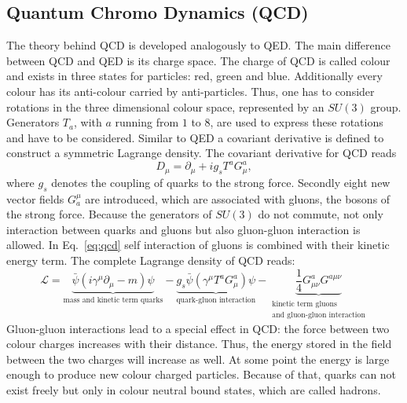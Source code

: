 	\subsection{Quantum Chromo Dynamics (QCD)}
	The theory behind QCD is developed analogously to QED. The main difference between QCD and QED is its charge space. The charge of QCD is called colour and exists in three states for particles: red, green and blue. Additionally every colour has its anti-colour carried by anti-particles. Thus, one has to consider rotations in the three dimensional colour space, represented by an $SU(3)$ group. Generators $T_a$, with $a$ running from $1$ to $8$, are used to express these rotations and have to be considered. Similar to QED a covariant derivative is defined to construct a symmetric Lagrange density. The covariant derivative for QCD reads
	\begin{equation}
	D_\mu = \partial_\mu + i g_s T^a G^a_{\mu},
	\end{equation}
	where $g_s$ denotes the coupling of quarks to the strong force. Secondly eight new vector fields $G_a^\mu$ are introduced, which are associated with gluons, the bosons of the strong force. Because the generators of $SU(3)$ do not commute, not only interaction between quarks and gluons but also gluon-gluon interaction is allowed. In Eq.~\ref{eq:qcd} self interaction of gluons is combined with their kinetic energy term. The complete Lagrange density of QCD reads:
	\begin{equation}
	\mathcal{L} = \underbrace{\bar{\psi}(i \gamma^\mu \partial_\mu -m ) \psi}_{\text{mass and kinetic term quarks}} - \underbrace{g_s \bar{\psi}(\gamma^\mu T^a G^a_\mu) \psi}_{\text{quark-gluon interaction}} - \underbrace{\frac{1}{4} G^a_{\mu \nu}G^{a \mu \nu}}_{\substack{\text{kinetic term gluons} \\ \text{and gluon-gluon interaction}}}
	\label{eq:qcd}
	\end{equation}
	Gluon-gluon interactions lead to a special effect in QCD: the force between two colour charges increases with their distance. Thus, the energy stored in the field between the two charges will increase as well. At some point the energy is large enough to produce new colour charged particles. Because of that, quarks can not exist freely but only in colour neutral bound states, which are called hadrons.
